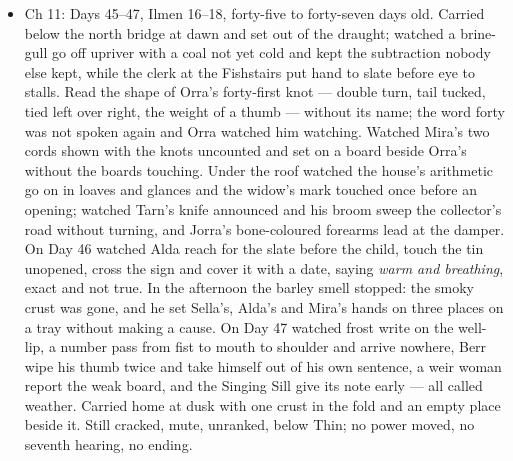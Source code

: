 \documentclass{design/chronicle}
\begin{document}
{\begin{itemize}[leftmargin=1.4em,itemsep=1pt,topsep=3pt,parsep=0pt]
\item Ch 11: Days 45–47, Ilmen 16–18, forty-five to forty-seven days old. Carried below the north bridge at dawn and set out of the draught; watched a brine-gull go off upriver with a coal not yet cold and kept the subtraction nobody else kept, while the clerk at the Fishstairs put hand to slate before eye to stalls. Read the shape of Orra’s forty-first knot --- double turn, tail tucked, tied left over right, the weight of a thumb --- without its name; the word forty was not spoken again and Orra watched him watching. Watched Mira’s two cords shown with the knots uncounted and set on a board beside Orra’s without the boards touching. Under the roof watched the house’s arithmetic go on in loaves and glances and the widow’s mark touched once before an opening; watched Tarn’s knife announced and his broom sweep the collector’s road without turning, and Jorra’s bone-coloured forearms lead at the damper. On Day 46 watched Alda reach for the slate before the child, touch the tin unopened, cross the sign and cover it with a date, saying \emph{warm and breathing}, exact and not true. In the afternoon the barley smell stopped: the smoky crust was gone, and he set Sella’s, Alda’s and Mira’s hands on three places on a tray without making a cause. On Day 47 watched frost write on the well-lip, a number pass from fist to mouth to shoulder and arrive nowhere, Berr wipe his thumb twice and take himself out of his own sentence, a weir woman report the weak board, and the Singing Sill give its note early --- all called weather. Carried home at dusk with one crust in the fold and an empty place beside it. Still cracked, mute, unranked, below Thin; no power moved, no seventh hearing, no ending.

\end{itemize}

\begin{itemize}[leftmargin=1.4em,itemsep=1pt,topsep=3pt,parsep=0pt]


\end{itemize}}
\end{document}
